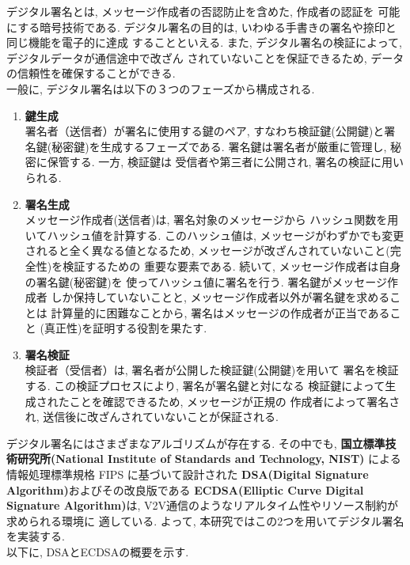 デジタル署名とは, メッセージ作成者の否認防止を含めた, 作成者の認証を
可能にする暗号技術である. 
デジタル署名の目的は, いわゆる手書きの署名や捺印と同じ機能を電子的に達成
することといえる. また, デジタル署名の検証によって, デジタルデータが通信途中で改ざん
されていないことを保証できるため, データの信頼性を確保することができる.\\
\indent 一般に, デジタル署名は以下の３つのフェーズから構成される.

\begin{enumerate}
  \item \textbf{鍵生成}\\
  \indent 署名者（送信者）が署名に使用する鍵のペア, 
  すなわち検証鍵(公開鍵)と署名鍵(秘密鍵)を生成するフェーズである. 
  署名鍵は署名者が厳重に管理し, 秘密に保管する. 一方, 検証鍵は
  受信者や第三者に公開され, 署名の検証に用いられる.
  \item \textbf{署名生成}\\
  \indent メッセージ作成者(送信者)は, 署名対象のメッセージから
  ハッシュ関数を用いてハッシュ値を計算する. このハッシュ値は, 
  メッセージがわずかでも変更されると全く異なる値となるため, 
  メッセージが改ざんされていないこと(完全性)を検証するための
  重要な要素である. 続いて, メッセージ作成者は自身の署名鍵(秘密鍵)を
  使ってハッシュ値に署名を行う. 署名鍵がメッセージ作成者
  しか保持していないことと, メッセージ作成者以外が署名鍵を求めることは
  計算量的に困難なことから, 署名はメッセージの作成者が正当であること
  (真正性)を証明する役割を果たす. 
  \item \textbf{署名検証}\\
  \indent 検証者（受信者）は, 署名者が公開した検証鍵(公開鍵)を用いて
  署名を検証する. この検証プロセスにより, 署名が署名鍵と対になる
  検証鍵によって生成されたことを確認できるため, メッセージが正規の
  作成者によって署名され, 送信後に改ざんされていないことが保証される.
\end{enumerate}

デジタル署名にはさまざまなアルゴリズムが存在する. その中でも,    
\textbf{国立標準技術研究所(National Institute of Standards and Technology, NIST)}
による情報処理標準規格 FIPS に基づいて設計された
\textbf{DSA(Digital Signature Algorithm)}およびその改良版である
\textbf{ECDSA(Elliptic Curve Digital Signature Algorithm)}は, 
V2V通信のようなリアルタイム性やリソース制約が求められる環境に
適している. よって, 本研究ではこの2つを用いてデジタル署名を実装する.\\
以下に, DSAとECDSAの概要を示す. \\[1em] 


\\

\\
